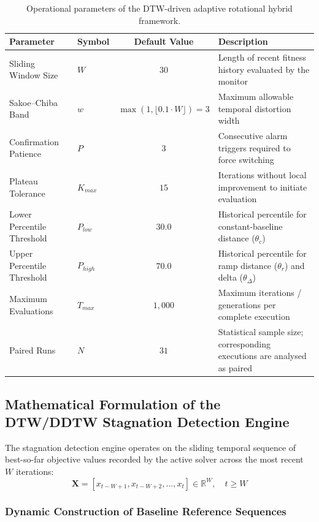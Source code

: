 \begin{table}[htbp]
\centering
\caption{Operational parameters of the DTW-driven adaptive rotational hybrid framework.}
\label{tab:framework_parameters}
\begin{tabular}{llcp{6.5cm}}
\toprule
\textbf{Parameter} & \textbf{Symbol} & \textbf{Default Value} & \textbf{Description} \\
\midrule
Sliding Window Size & $W$ & $30$ & Length of recent fitness history evaluated by the monitor \\
Sakoe--Chiba Band & $w$ & $\max(1, \lfloor 0.1 \cdot W \rfloor) = 3$ & Maximum allowable temporal distortion width \\
Confirmation Patience & $P$ & $3$ & Consecutive alarm triggers required to force switching \\
Plateau Tolerance & $K_{max}$ & $15$ & Iterations without local improvement to initiate evaluation \\
Lower Percentile Threshold & $P_{low}$ & $30.0$ & Historical percentile for constant-baseline distance ($\theta_c$) \\
Upper Percentile Threshold & $P_{high}$ & $70.0$ & Historical percentile for ramp distance ($\theta_r$) and delta ($\theta_\Delta$) \\
Maximum Evaluations & $T_{max}$ & $1,000$ & Maximum iterations / generations per complete execution \\
Paired Runs & $N$ & $31$ & Statistical sample size; corresponding executions are analysed as paired \\
\bottomrule
\end{tabular}
\end{table}

\subsection{Mathematical Formulation of the DTW/DDTW Stagnation Detection Engine}
\label{sec:dtw_formulation}

The stagnation detection engine operates on the sliding temporal sequence of best-so-far objective values recorded by the active solver across the most recent $W$ iterations:
\begin{equation}
\mathbf{X} = \left[ x_{t-W+1}, x_{t-W+2}, \dots, x_t \right] \in \mathbb{R}^W, \quad t \ge W
\label{eq:sliding_window}
\end{equation}

\subsubsection{Dynamic Construction of Baseline Reference Sequences}

